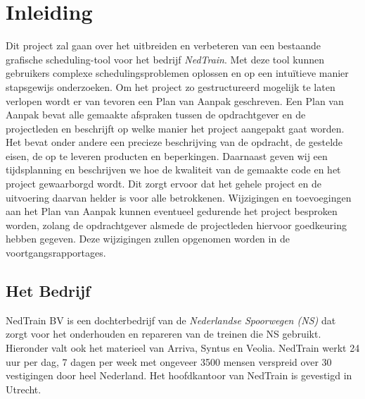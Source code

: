 \section{Inleiding}
Dit project zal gaan over het uitbreiden en verbeteren van een bestaande grafische scheduling-tool voor het bedrijf \emph{NedTrain}. Met deze tool kunnen gebruikers complexe schedulingsproblemen oplossen en op een intu\"itieve manier stapsgewijs onderzoeken. Om het project zo gestructureerd mogelijk te laten verlopen wordt er van tevoren een Plan van Aanpak geschreven. Een Plan van Aanpak bevat alle gemaakte afspraken tussen de opdrachtgever en de projectleden en beschrijft op welke manier het project aangepakt gaat worden. Het bevat onder andere een precieze beschrijving van de opdracht, de gestelde eisen, de op te leveren producten en beperkingen. Daarnaast geven wij een tijdsplanning en beschrijven we hoe de kwaliteit van de gemaakte code en het project gewaarborgd wordt. Dit zorgt ervoor dat het gehele project en de uitvoering daarvan helder is voor alle betrokkenen. Wijzigingen en toevoegingen aan het Plan van Aanpak kunnen eventueel gedurende het project besproken worden, zolang de opdrachtgever alsmede de projectleden hiervoor goedkeuring hebben gegeven. Deze wijzigingen zullen opgenomen worden in de voortgangsrapportages.

\subsection{Het Bedrijf}
NedTrain BV is een dochterbedrijf van de \emph{Nederlandse Spoorwegen (NS)} dat zorgt voor het onderhouden en repareren van de treinen die NS gebruikt. \cite{NedTrainSite} Hieronder valt ook het materieel van Arriva, Syntus en Veolia. NedTrain werkt 24 uur per dag, 7 dagen per week met ongeveer 3500 mensen verspreid over 30 vestigingen door heel Nederland. Het hoofdkantoor van NedTrain is gevestigd in Utrecht.

